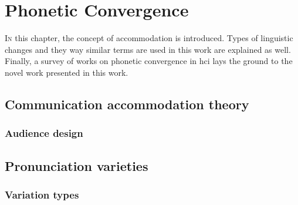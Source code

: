 \chapter{Phonetic Convergence}
\label{chap:phonetic_convergence}

\lettrine{I}{n} this chapter, the concept of accommodation is introduced.
Types of linguistic changes and they way similar terms are used in this work are explained as well.
Finally, a survey of works on phonetic convergence in \acl{hci} lays the ground to the novel work presented in this work.

\pagebreak

\section{Communication accommodation theory}
\label{sec:communication_accommodation_theory}

\citet{Racz2020morphological}  %
\citet{Aubanel2020speaking}  %

\subsection{Audience design}
\label{subsec:audience_design}


\section{Pronunciation varieties}
\label{sec:pronunciation_varieties}


\subsection{Variation types}
\label{subsec:variation_types}

